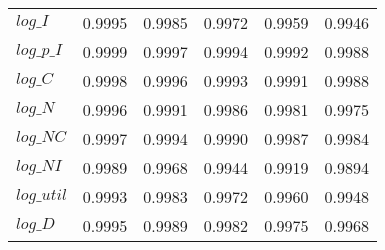 \begin{center}
\begin{longtable}{lccccc}
$log\_I     $	 & 	    0.9995	 & 	    0.9985	 & 	    0.9972	 & 	    0.9959	 & 	    0.9946 \\ 
$log\_p\_I  $	 & 	    0.9999	 & 	    0.9997	 & 	    0.9994	 & 	    0.9992	 & 	    0.9988 \\ 
$log\_C     $	 & 	    0.9998	 & 	    0.9996	 & 	    0.9993	 & 	    0.9991	 & 	    0.9988 \\ 
$log\_N     $	 & 	    0.9996	 & 	    0.9991	 & 	    0.9986	 & 	    0.9981	 & 	    0.9975 \\ 
$log\_NC    $	 & 	    0.9997	 & 	    0.9994	 & 	    0.9990	 & 	    0.9987	 & 	    0.9984 \\ 
$log\_NI    $	 & 	    0.9989	 & 	    0.9968	 & 	    0.9944	 & 	    0.9919	 & 	    0.9894 \\ 
$log\_util  $	 & 	    0.9993	 & 	    0.9983	 & 	    0.9972	 & 	    0.9960	 & 	    0.9948 \\ 
$log\_D     $	 & 	    0.9995	 & 	    0.9989	 & 	    0.9982	 & 	    0.9975	 & 	    0.9968 \\ 
\end{longtable}
 \end{center}
